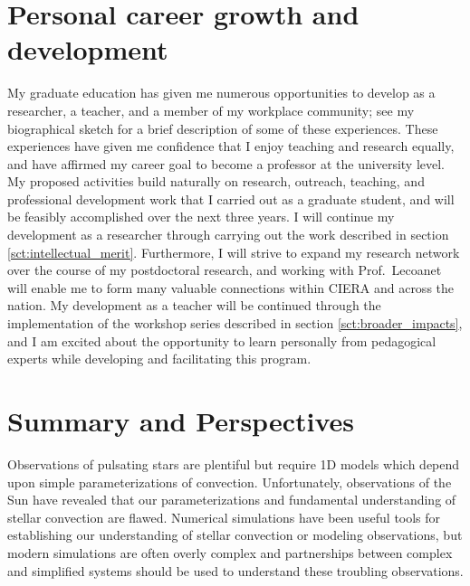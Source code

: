 \documentclass[11pt, preprint]{aastex}
\begin{document}
\section{Personal career growth and development}
\vspace{-6pt}
\label{sct:personal_growth}
My graduate education has given me numerous opportunities to develop as a researcher, a teacher, and a member of my workplace community; see my biographical sketch for a brief description of some of these experiences.
These experiences have given me confidence that I enjoy teaching and research equally, and have affirmed my career goal to become a professor at the university level.
My proposed activities build naturally on research, outreach, teaching, and professional development work that I carried out as a graduate student, and will be feasibly accomplished over the next three years.
I will continue my development as a researcher through carrying out the work described in section \ref{sct:intellectual_merit}.
Furthermore, I will strive to expand my research network over the course of my postdoctoral research, and working with Prof.~Lecoanet will enable me to form many valuable connections within CIERA and across the nation.
My development as a teacher will be continued through the implementation of the workshop series described in section \ref{sct:broader_impacts}, and I am excited about the opportunity to learn personally from pedagogical experts while developing and facilitating this program.

\section{Summary and Perspectives}
\vspace{-6pt}
Observations of pulsating stars are plentiful but require 1D models which depend upon simple parameterizations of convection.
Unfortunately, observations of the Sun have revealed that our parameterizations and fundamental understanding of stellar convection are flawed.
Numerical simulations have been useful tools for establishing our understanding of stellar convection or modeling observations, but modern simulations are often overly complex and partnerships between complex and simplified systems should be used to understand these troubling observations.
\end{document}
